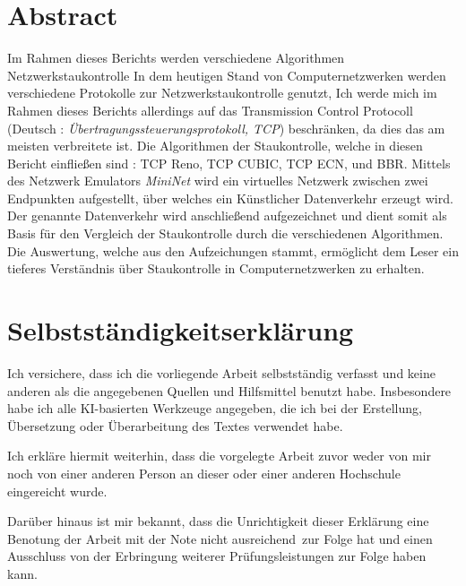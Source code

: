 \documentclass[paper=a4,fontsize=12pt,ngerman]{scrartcl}
\begin{document}
\pagestyle{plain}



\section*{Abstract}


\;
Im Rahmen dieses Berichts werden verschiedene Algorithmen Netzwerkstaukontrolle
In dem heutigen Stand von Computernetzwerken werden verschiedene Protokolle zur Netzwerkstaukontrolle genutzt, 
Ich werde mich im Rahmen dieses Berichts allerdings auf das Transmission Control Protocoll 
(Deutsch : \textit{Übertragungssteuerungsprotokoll, TCP}) beschränken, da dies das am meisten verbreitete ist.  
Die Algorithmen der Staukontrolle, welche in diesen Bericht einfließen sind : TCP Reno, TCP CUBIC, TCP ECN, und BBR.
\newline
Mittels des Netzwerk Emulators \textit{MiniNet} wird ein virtuelles Netzwerk zwischen zwei Endpunkten aufgestellt, über
welches ein Künstlicher Datenverkehr erzeugt wird.
Der genannte Datenverkehr wird anschließend aufgezeichnet und dient somit als Basis für den Vergleich der Staukontrolle durch 
die verschiedenen Algorithmen.
Die Auswertung, welche aus den Aufzeichungen stammt, ermöglicht dem Leser ein tieferes Verständnis über Staukontrolle in Computernetzwerken
zu erhalten. 





\newpage
\section*{Selbstständigkeitserklärung}
Ich versichere, dass ich die vorliegende Arbeit selbstständig verfasst und 
keine anderen als die angegebenen Quellen und Hilfsmittel benutzt habe.
Insbesondere habe ich alle KI-basierten Werkzeuge angegeben, die ich bei
der Erstellung, Übersetzung oder Überarbeitung des Textes verwendet habe.

Ich erkläre hiermit weiterhin, dass die vorgelegte Arbeit zuvor weder von mir 
noch von einer anderen Person an dieser oder einer anderen Hochschule 
eingereicht wurde.

Darüber hinaus ist mir bekannt, dass die Unrichtigkeit dieser Erklärung eine 
Benotung der Arbeit mit der Note \glqq nicht ausreichend\grqq \ zur Folge hat 
und einen Ausschluss von der Erbringung weiterer Prüfungsleistungen zur Folge 
haben kann.
\bigskip
 
\end{document}
